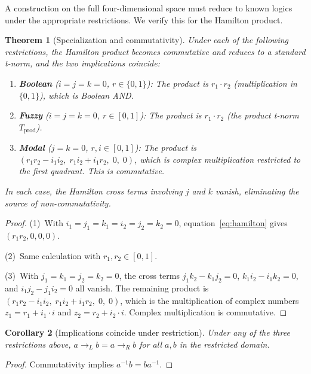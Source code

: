 \documentclass[11pt,a4paper]{article}
\newtheorem{theorem}{Theorem}
\newtheorem{corollary}[theorem]{Corollary}
\begin{document}
A construction on the full four-dimensional space must reduce to known
logics under the appropriate restrictions. We verify this for the
Hamilton product.

\begin{theorem}[Specialization and commutativity]
\label{thm:specialization}
Under each of the following restrictions, the Hamilton product becomes
commutative and reduces to a standard t-norm, and the two implications
coincide:
\begin{enumerate}[nosep]
\item \textbf{Boolean} ($i = j = k = 0$, $r \in \{0, 1\}$):
  The product is $r_1 \cdot r_2$ (multiplication in $\{0,1\}$), which
  is Boolean AND.
\item \textbf{Fuzzy} ($i = j = k = 0$, $r \in [0,1]$):
  The product is $r_1 \cdot r_2$ (the product t-norm
  $T_{\mathrm{prod}}$).
\item \textbf{Modal} ($j = k = 0$, $r, i \in [0,1]$):
  The product is $(r_1 r_2 - i_1 i_2, \; r_1 i_2 + i_1 r_2, \; 0,
  \; 0)$, which is complex multiplication restricted to the first
  quadrant. This is commutative.
\end{enumerate}
In each case, the Hamilton cross terms involving $j$ and $k$ vanish,
eliminating the source of non-commutativity.
\end{theorem}

\begin{proof}
(1)~With $i_1 = j_1 = k_1 = i_2 = j_2 = k_2 = 0$,
equation~\eqref{eq:hamilton} gives $(r_1 r_2, 0, 0, 0)$.

(2)~Same calculation with $r_1, r_2 \in [0,1]$.

(3)~With $j_1 = k_1 = j_2 = k_2 = 0$, the cross terms
$j_1 k_2 - k_1 j_2 = 0$, $k_1 i_2 - i_1 k_2 = 0$, and
$i_1 j_2 - j_1 i_2 = 0$ all vanish. The remaining product is
$(r_1 r_2 - i_1 i_2, \; r_1 i_2 + i_1 r_2, \; 0, \; 0)$, which is
the multiplication of complex numbers $z_1 = r_1 + i_1 \cdot i$ and
$z_2 = r_2 + i_2 \cdot i$. Complex multiplication is commutative.
\end{proof}

\begin{corollary}[Implications coincide under restriction]
\label{cor:imp-coincide}
Under any of the three restrictions above, $a \to_L b = a \to_R b$ for
all $a, b$ in the restricted domain.
\end{corollary}

\begin{proof}
Commutativity implies $a^{-1} b = b a^{-1}$.
\end{proof}
\end{document}

